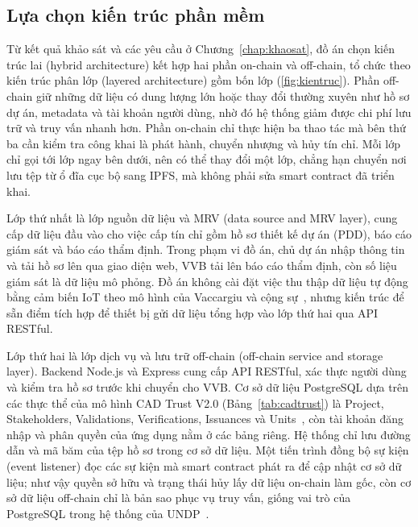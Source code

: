 \subsection*{Lựa chọn kiến trúc phần mềm}
\label{sec:kientruc}

Từ kết quả khảo sát và các yêu cầu ở Chương~\ref{chap:khaosat}, đồ án chọn kiến trúc lai (hybrid architecture) kết hợp hai phần on-chain và off-chain, tổ chức theo kiến trúc phân lớp (layered architecture) gồm bốn lớp (\autoref{fig:kientruc}). Phần off-chain giữ những dữ liệu có dung lượng lớn hoặc thay đổi thường xuyên như hồ sơ dự án, metadata và tài khoản người dùng, nhờ đó hệ thống giảm được chi phí lưu trữ và truy vấn nhanh hơn. Phần on-chain chỉ thực hiện ba thao tác mà bên thứ ba cần kiểm tra công khai là phát hành, chuyển nhượng và hủy tín chỉ. Mỗi lớp chỉ gọi tới lớp ngay bên dưới, nên có thể thay đổi một lớp, chẳng hạn chuyển nơi lưu tệp từ ổ đĩa cục bộ sang IPFS, mà không phải sửa smart contract đã triển khai.

Lớp thứ nhất là lớp nguồn dữ liệu và MRV (data source and MRV layer), cung cấp dữ liệu đầu vào cho việc cấp tín chỉ gồm hồ sơ thiết kế dự án (PDD), báo cáo giám sát và báo cáo thẩm định. Trong phạm vi đồ án, chủ dự án nhập thông tin và tải hồ sơ lên qua giao diện web, VVB tải lên báo cáo thẩm định, còn số liệu giám sát là dữ liệu mô phỏng. Đồ án không cài đặt việc thu thập dữ liệu tự động bằng cảm biến IoT theo mô hình của Vaccargiu và cộng sự~\cite{vaccargiu2026blockchain}, nhưng kiến trúc để sẵn điểm tích hợp để thiết bị gửi dữ liệu tổng hợp vào lớp thứ hai qua API RESTful.

Lớp thứ hai là lớp dịch vụ và lưu trữ off-chain (off-chain service and storage layer). Backend Node.js và Express cung cấp API RESTful, xác thực người dùng và kiểm tra hồ sơ trước khi chuyển cho VVB. Cơ sở dữ liệu PostgreSQL dựa trên các thực thể của mô hình CAD Trust V2.0 (Bảng~\ref{tab:cadtrust}) là Project, Stakeholders, Validations, Verifications, Issuances và Units~\cite{cadtrust2025datamodel}, còn tài khoản đăng nhập và phân quyền của ứng dụng nằm ở các bảng riêng. Hệ thống chỉ lưu đường dẫn và mã băm của tệp hồ sơ trong cơ sở dữ liệu. Một tiến trình đồng bộ sự kiện (event listener) đọc các sự kiện mà smart contract phát ra để cập nhật cơ sở dữ liệu; như vậy quyền sở hữu và trạng thái hủy lấy dữ liệu on-chain làm gốc, còn cơ sở dữ liệu off-chain chỉ là bản sao phục vụ truy vấn, giống vai trò của PostgreSQL trong hệ thống của UNDP~\cite{undp2024nationalregistry}.

